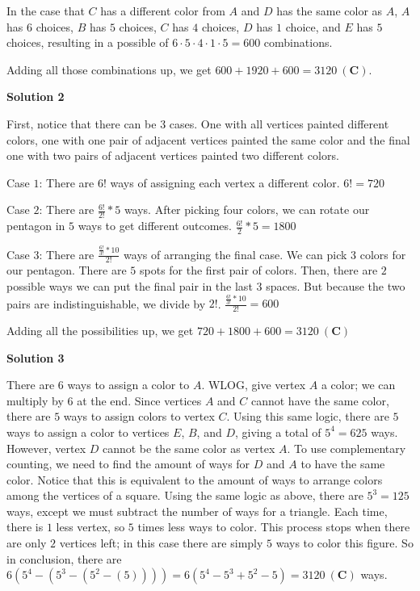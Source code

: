 \begin{enumerate}
 In the case that $C$ has a different color from $A$ and $D$ has the same color as $A$, $A$ has $6$ choices, $B$ has $5$ choices, $C$ has $4$ choices, $D$ has $1$ choice, and $E$ has $5$ choices, resulting in a possible of $6 \cdot 5 \cdot 4 \cdot 1 \cdot 5 = 600$ combinations.

 Adding all those combinations up, we get $600+1920+600=\boxed{3120 \ \mathbf{(C)}}$.

 



\textbf{Solution 2}

First, notice that there can be $3$ cases. One with all vertices painted different colors, one with one pair of adjacent vertices painted the same color and the final one with two pairs of adjacent vertices painted two different colors.

 Case $1$: There are $6!$ ways of assigning each vertex a different color. $6! = 720$

 Case $2$: There are $\frac {6!}{2!} * 5$ ways. After picking four colors, we can rotate our pentagon in $5$ ways to get different outcomes. $\frac {6!}{2} * 5 = 1800$

 Case $3$: There are $\frac {\frac {6!}{3!} * 10}{2!}$ ways of arranging the final case. We can pick $3$ colors for our pentagon. There are $5$ spots for the first pair of colors. Then, there are $2$ possible ways we can put the final pair in the last $3$ spaces. But because the two pairs are indistinguishable, we divide by $2!$. $\frac {\frac {6!}{3!} * 10}{2!} = 600$

 Adding all the possibilities up, we get $720+1800+600=\boxed{3120 \ \mathbf{(C)}}$




\textbf{Solution 3}

There are $6$ ways to assign a color to $A$. WLOG, give vertex $A$ a color; we can multiply by $6$ at the end. Since vertices $A$ and $C$ cannot have the same color, there are $5$ ways to assign colors to vertex $C$. Using this same logic, there are $5$ ways to assign a color to vertices $E$, $B$, and $D$, giving a total of $5^4=625$ ways. However, vertex $D$ cannot be the same color as vertex $A$. To use complementary counting, we need to find the amount of ways for $D$ and $A$ to have the same color. Notice that this is equivalent to the amount of ways to arrange colors among the vertices of a square. Using the same logic as above, there are $5^3=125$ ways, except we must subtract the number of ways for a triangle. Each time, there is $1$ less vertex, so $5$ times less ways to color. This process stops when there are only $2$ vertices left; in this case there are simply $5$ ways to color this figure. So in conclusion, there are $6(5^4-(5^3-(5^2-(5))))=6(5^4-5^3+5^2-5)=\boxed{3120 \ \mathbf{(C)}}$ ways.


\end{enumerate}
